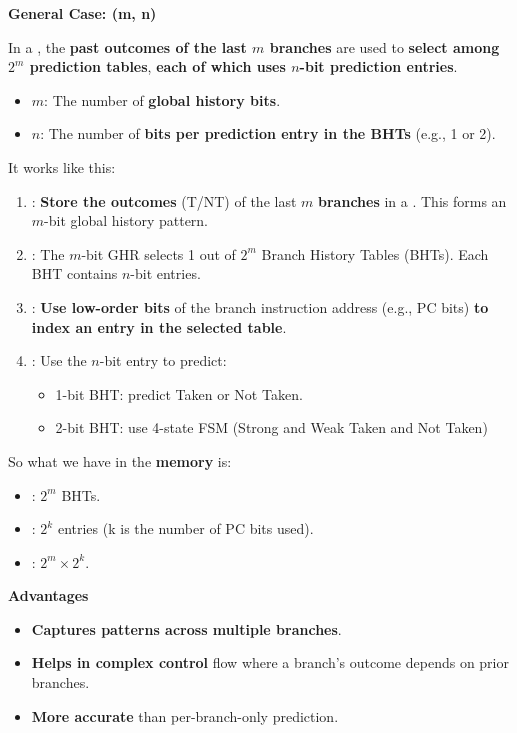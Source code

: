 \highspace
\begin{flushleft}
    \textcolor{Green3}{ \textbf{General Case: (m, n)}}
\end{flushleft}
In a , the \textbf{past outcomes of the last $m$ branches} are used to \textbf{select among $2^{m}$ prediction tables}, \textbf{each of which uses $n$-bit prediction entries}.
\begin{itemize}
    \item $m$: The number of \textbf{global history bits}.
    \item $n$: The number of \textbf{bits per prediction entry in the BHTs} (e.g., 1 or 2).
\end{itemize}
It works like this:
\begin{enumerate}
    \item {}: \textbf{Store the outcomes} (T/NT) of the last $m$ \textbf{branches} in a . This forms an $m$-bit global history pattern.

    \item {}: The $m$-bit GHR selects 1 out of $2^{m}$ Branch History Tables (BHTs). Each BHT contains $n$-bit entries.

    \item {}: \textbf{Use low-order bits} of the branch instruction address (e.g., PC bits) \textbf{to index an entry in the selected table}.
    
    \item {}: Use the $n$-bit entry to predict:
    \begin{itemize}
        \item 1-bit BHT: predict Taken or Not Taken.
        \item 2-bit BHT: use 4-state FSM (Strong and Weak Taken and Not Taken)
    \end{itemize}
\end{enumerate}
So what we have in the \textbf{memory} is:
\begin{itemize}
    \item {}: $2^{m}$ BHTs.
    \item {}: $2^{k}$ entries (k is the number of PC bits used).
    \item {}: $2^{m} \times 2^{k}$.
\end{itemize}

\highspace
\begin{flushleft}
    \textcolor{Green3}{ \textbf{Advantages}}
\end{flushleft}
\begin{itemize}
    \item \textbf{Captures patterns across multiple branches}.
    \item \textbf{Helps in complex control} flow where a branch's outcome depends on prior branches.
    \item \textbf{More accurate} than per-branch-only prediction.
\end{itemize}